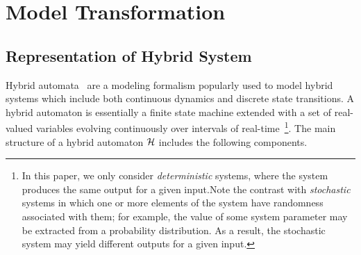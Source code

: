 %
%
%
\section{Model Transformation}
% 
\subsection{Representation of Hybrid System}
Hybrid automata~\cite{alur1995algorithmic} are a modeling formalism popularly used to model hybrid systems which include both continuous dynamics and discrete state transitions. A hybrid automaton is essentially a finite state machine extended with a set of real-valued variables evolving continuously over intervals of real-time~\cite{alur1995algorithmic}\footnote{In this paper, we only consider \emph{deterministic} systems, where the system produces the same output for a given input.Note the contrast with {\em stochastic} systems in which one or more elements of the system have randomness associated with them; for example, the value of some system parameter may be extracted from a probability distribution. As a result, the stochastic system may yield different outputs for a given input.}. 
The main structure of a hybrid automaton ${\mathcal H}$ includes the following components.
%
%
%
%
%

